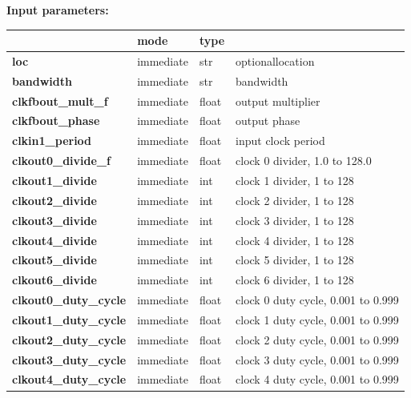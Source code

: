             {\bf Input parameters:} \\            
            \begin{tabular}{| l | l | l | l |}
            \hline
                                          & mode  & type   & \\
            \hline \hline
            {\bf loc}                     & immediate & str   & optionallocation \\ \hline
            {\bf bandwidth}               & immediate & str   & bandwidth \\ \hline
            {\bf clkfbout\_mult\_f}       & immediate & float & output multiplier \\ \hline
            {\bf clkfbout\_phase}         & immediate & float & output phase \\ \hline
            {\bf clkin1\_period}          & immediate & float & input clock period \\ \hline
            {\bf clkout0\_divide\_f}      & immediate & float & clock 0 divider, 1.0 to 128.0\\ \hline
            {\bf clkout1\_divide}         & immediate & int   & clock 1 divider, 1 to 128\\ \hline
            {\bf clkout2\_divide}         & immediate & int   & clock 2 divider, 1 to 128\\ \hline
            {\bf clkout3\_divide}         & immediate & int   & clock 3 divider, 1 to 128\\ \hline
            {\bf clkout4\_divide}         & immediate & int   & clock 4 divider, 1 to 128\\ \hline
            {\bf clkout5\_divide}         & immediate & int   & clock 5 divider, 1 to 128\\ \hline
            {\bf clkout6\_divide}         & immediate & int   & clock 6 divider, 1 to 128\\ \hline
            {\bf clkout0\_duty\_cycle}    & immediate & float & clock 0 duty cycle, 0.001 to 0.999\\ \hline
            {\bf clkout1\_duty\_cycle}    & immediate & float & clock 1 duty cycle, 0.001 to 0.999\\ \hline
            {\bf clkout2\_duty\_cycle}    & immediate & float & clock 2 duty cycle, 0.001 to 0.999\\ \hline
            {\bf clkout3\_duty\_cycle}    & immediate & float & clock 3 duty cycle, 0.001 to 0.999\\ \hline
            {\bf clkout4\_duty\_cycle}    & immediate & float & clock 4 duty cycle, 0.001 to 0.999\\ \hline

\end{tabular}
